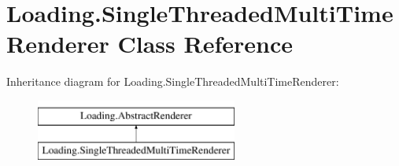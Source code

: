 \hypertarget{class_loading_1_1_single_threaded_multi_time_renderer}{}\section{Loading.\+Single\+Threaded\+Multi\+Time\+Renderer Class Reference}
\label{class_loading_1_1_single_threaded_multi_time_renderer}
Inheritance diagram for Loading.\+Single\+Threaded\+Multi\+Time\+Renderer\+:\begin{figure}[H]
\begin{center}
\leavevmode
\includegraphics[height=2.000000cm]{class_loading_1_1_single_threaded_multi_time_renderer}
\end{center}
\end{figure}
